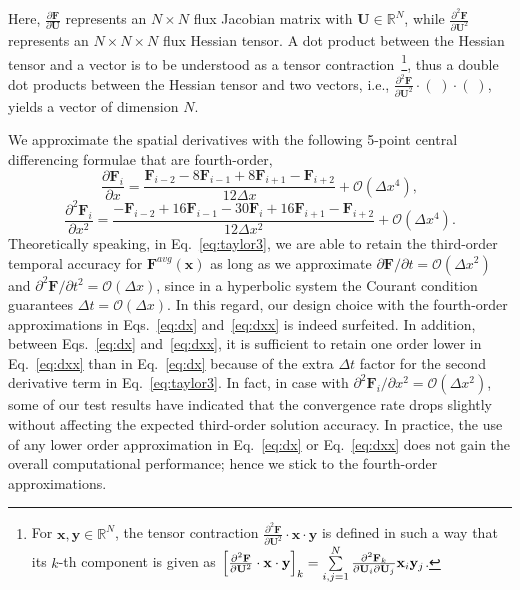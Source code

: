 \documentclass[times,preprint,3p]{elsarticle}
\newcommand{\bfx}{\mathbf{x}}
\newcommand{\bfy}{\mathbf{y}}
\newcommand{\pd}[2]{\frac{\partial #1}{\partial #2}}
\newcommand{\pdd}[2]{\frac{\partial^{2} #1}{\partial #2^{2}}}
\newcommand{\dt}{\Delta t}
\newcommand{\dx}{\Delta x}
\newcommand{\bF}{\mathbf{F}}
\newcommand{\bU}{\mathbf{U}}
\newcommand{\bx}{\mathbf{x}}
\begin{document}
%
%
Here, \( \pd{\bF}{\bU} \) represents an $N\times N$ flux Jacobian matrix with $\bU \in \mathbb{R}^N$,
while \( \pdd{\bF}{\bU} \) represents an $N\times N \times N$ flux Hessian tensor.
A dot product between the Hessian tensor and a vector is to be understood
as a tensor contraction~\footnote[$\ddagger$]
    {For $\bfx,\bfy \in \mathbb{R}^N$, the tensor contraction
    $\pdd{\bF}{\bU} \cdot \bfx  \cdot  \bfy $ is defined in such a way that its $k$-th component is given as
    $\Bigl[ \pdd{\bF}{\bU} \cdot \bfx  \cdot  \bfy \Bigr]_k  =
    \sum\limits_{i,j=1}^{N} \frac{\partial^2 \bF_k}{\partial \bU_i \partial \bU_j} \bfx_i \bfy_j$.},
thus a double dot products
between the Hessian tensor
and two vectors, i.e.,
\( \pdd{\bF}{\bU} \cdot \left( \; \right) \cdot \left( \; \right) \),
yields a vector of dimension $N$.

We approximate the spatial derivatives with the following 5-point central differencing formulae that are fourth-order,
\begin{equation}\label{eq:dx}
    \pd{\bF_{i}}{x} = \frac{\bF_{i-2} - 8 \bF_{i-1} + 8 \bF_{i+1} - \bF_{i+2} }{12\dx} + \mathcal{O}(\dx^{4}),
\end{equation}
\begin{equation}\label{eq:dxx}
    \pdd{\bF_{i}}{x} = \frac{-\bF_{i-2} + 16 \bF_{i-1} - 30 \bF_{i} + 16 \bF_{i+1} - \bF_{i+2} }{12\dx^{2}} + \mathcal{O}(\dx^{4}).
\end{equation}
Theoretically speaking, in Eq.~\eqref{eq:taylor3},
we are able to retain the third-order temporal accuracy for $\bF^{avg}(\bx)$
as long as we approximate
${\partial \bF}/{\partial t} = \mathcal{O}(\dx^2)$ and
${\partial^2 \bF}/{\partial t^2} = \mathcal{O}(\dx)$,
since in a hyperbolic system the Courant condition guarantees $\dt = \mathcal{O}(\dx)$.
In this regard, our design choice with the fourth-order approximations in
Eqs.~\eqref{eq:dx} and~\eqref{eq:dxx} is indeed surfeited.
In addition, between Eqs.~\eqref{eq:dx} and~\eqref{eq:dxx},
it is sufficient to retain one order lower in Eq.~\eqref{eq:dxx} than in Eq.~\eqref{eq:dx}
because of the extra $\dt$ factor for the second derivative term in Eq.~\eqref{eq:taylor3}.
In fact, in case with ${\partial^2 \bF_i}/{\partial x^2} = \mathcal{O}(\dx^2)$,
some of our test results have indicated that the convergence rate drops slightly
without affecting the expected third-order solution accuracy.
In practice, the use of any lower order approximation in Eq.~\eqref{eq:dx} or Eq.~\eqref{eq:dxx}
does not gain the overall computational performance; hence we stick to the fourth-order
approximations.
\end{document}

